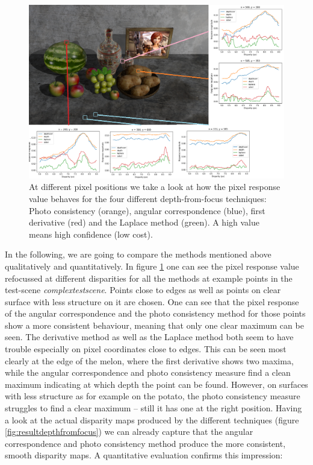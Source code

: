 \documentclass  [
  paper    = a4,
  BCOR     = 10mm,
  twoside,
  fontsize = 12pt,
  fleqn,
  toc      = bibnumbered,
  toc      = listofnumbered,
  numbers  = noendperiod,
  headings = normal,
  listof   = leveldown,
  version  = 3.03
]                                       {scrreprt}
\begin{document}
\begin{figure}[h!]
	\centering
	\includegraphics[width=1\linewidth]{images/original_marked}
	\caption[Pixel response for depth from focus techniques]{At different pixel positions we take a look at how the pixel response value behaves for the four different depth-from-focus techniques: Photo consistency (orange), angular correspondence (blue), first derivative (red) and the Laplace method (green). A high value means high confidence (low cost).}
	\label{fig:originalmarked}
\end{figure}
	In the following, we are going to compare the methods mentioned above qualitatively and quantitatively. In figure \ref{fig:originalmarked} one can see the pixel response value refocussed at different disparities for all the methods at example points in the test-scene \textit{complextestscene}. Points close to edges as well as points on clear surface with less structure on it are chosen. One can see that the pixel response of the angular correspondence and the photo consistency method for those points show a more consistent behaviour, meaning that only one clear maximum can be seen. The derivative method as well as the Laplace method both seem to have trouble especially on pixel coordinates close to edges. This can be seen most clearly at the edge of the melon, where the first derivative shows two maxima, while the angular correspondence and photo consistency measure find a clean maximum indicating at which depth the point can be found. However, on surfaces with less structure as for example on the potato, the photo consistency measure struggles to find a clear maximum -- still it has one at the right position. 
	Having a look at the actual disparity maps produced by the different techniques (figure \ref{fig:resultdepthfromfocus}) we can already capture that the angular correspondence and photo consistency method produce the more consistent, smooth disparity maps. A quantitative evaluation confirms this impression:
\end{document}
